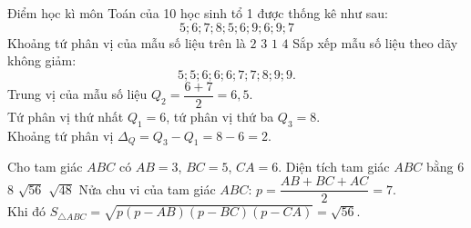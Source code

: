 \begin{ex}%
	Điểm học kì môn Toán của 10 học sinh tổ 1 được thống kê như sau:
	\[5;6;7;8;5;6;9;6;9;7\]
	Khoảng tứ phân vị của mẫu số liệu trên là 
	\choice 
	{\True $2$}
	{$3$}
	{$1$}
	{$4$}
	\loigiai 
	{
		Sắp xếp mẫu số liệu theo dãy không giảm:
		\[5;5;6;6;6;7;7;8;9;9. \]
		Trung vị của mẫu số liệu $Q_2=\dfrac{6+7}{2}=6,5$.\\
		Tứ phân vị thứ nhất $Q_1=6$, tứ phân vị thứ ba $Q_3=8$.\\
		Khoảng tứ phân vị $\Delta_Q=Q_3-Q_1=8-6=2$.
	}
\end{ex}

\begin{ex}%
	Cho tam giác $ABC$ có $AB=3$, $BC=5$, $CA=6$. Diện tích tam giác $ABC$ bằng 
	\choice 
	{$6$}
	{$8$}
	{\True $\sqrt{56}$}
	{$\sqrt{48}$}
	\loigiai 
	{
		Nửa chu vi của tam giác $ABC$: $p=\dfrac{AB+BC+AC}{2}=7$.\\
		Khi đó $S_{\triangle ABC}=\sqrt{p(p-AB)(p-BC)(p-CA)}=\sqrt{56}$.
	}
\end{ex}

